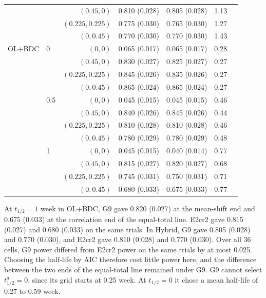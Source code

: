 \documentclass[
  11pt,
]{article}
\begin{document}
\begin{table}[H]
\begin{tabular}{llrrrrr}
 &  & $(0.45, 0)$ & 0.810 (0.028) & 0.805 (0.028) & 1.13 \\
 &  & $(0.225, 0.225)$ & 0.775 (0.030) & 0.765 (0.030) & 1.27 \\
 &  & $(0, 0.45)$ & 0.770 (0.030) & 0.770 (0.030) & 1.43 \\
OL+BDC & 0 & $(0, 0)$ & 0.065 (0.017) & 0.065 (0.017) & 0.28 \\
 &  & $(0.45, 0)$ & 0.830 (0.027) & 0.825 (0.027) & 0.27 \\
 &  & $(0.225, 0.225)$ & 0.845 (0.026) & 0.835 (0.026) & 0.27 \\
 &  & $(0, 0.45)$ & 0.865 (0.024) & 0.865 (0.024) & 0.27 \\
 & 0.5 & $(0, 0)$ & 0.045 (0.015) & 0.045 (0.015) & 0.46 \\
 &  & $(0.45, 0)$ & 0.840 (0.026) & 0.845 (0.026) & 0.44 \\
 &  & $(0.225, 0.225)$ & 0.810 (0.028) & 0.810 (0.028) & 0.46 \\
 &  & $(0, 0.45)$ & 0.780 (0.029) & 0.780 (0.029) & 0.48 \\
 & 1 & $(0, 0)$ & 0.045 (0.015) & 0.040 (0.014) & 0.77 \\
 &  & $(0.45, 0)$ & 0.815 (0.027) & 0.820 (0.027) & 0.68 \\
 &  & $(0.225, 0.225)$ & 0.745 (0.031) & 0.750 (0.031) & 0.71 \\
 &  & $(0, 0.45)$ & 0.680 (0.033) & 0.675 (0.033) & 0.77 \\
\bottomrule
\end{tabular}
\end{table}

At \(t_{1/2} = 1\) week in OL+BDC, G9 gave 0.820 (0.027) at the mean-shift end and 0.675 (0.033) at the correlation end of the equal-total line. E2cr2 gave 0.815 (0.027) and 0.680 (0.033) on the same trials. In Hybrid, G9 gave 0.805 (0.028) and 0.770 (0.030), and E2cr2 gave 0.810 (0.028) and 0.770 (0.030). Over all 36 cells, G9 power differed from E2cr2 power on the same trials by at most 0.025. Choosing the half-life by AIC therefore cost little power here, and the difference between the two ends of the equal-total line remained under G9. G9 cannot select \(t_{1/2}^a = 0\), since its grid starts at 0.25 week. At \(t_{1/2} = 0\) it chose a mean half-life of 0.27 to 0.59 week.
\end{document}
